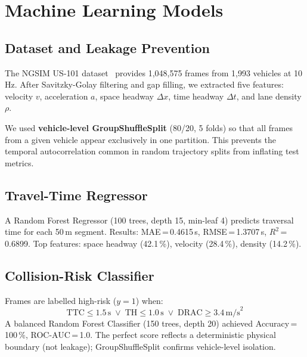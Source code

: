 \documentclass[conference]{IEEEtran}
\begin{document}
\section{Machine Learning Models}
\label{sec:ml}

\subsection{Dataset and Leakage Prevention}

The NGSIM US-101 dataset~\cite{NGSIM2006} provides 1,048,575 frames from
1,993 vehicles at 10\,Hz. After Savitzky-Golay filtering and gap filling,
we extracted five features: velocity $v$, acceleration $a$, space headway
$\Delta x$, time headway $\Delta t$, and lane density $\rho$.

We used \textbf{vehicle-level GroupShuffleSplit} (80/20, 5 folds) so that
all frames from a given vehicle appear exclusively in one partition. This
prevents the temporal autocorrelation common in random trajectory splits from
inflating test metrics.

\subsection{Travel-Time Regressor}

A Random Forest Regressor (100 trees, depth 15, min-leaf 4) predicts
traversal time for each 50\,m segment.
Results: MAE\,=\,0.4615\,s, RMSE\,=\,1.3707\,s, $R^2$\,=\,0.6899.
Top features: space headway (42.1\,\%), velocity (28.4\,\%), density
(14.2\,\%).

\subsection{Collision-Risk Classifier}

Frames are labelled high-risk ($y\!=\!1$) when:
\begin{equation}
  \mathrm{TTC} \leq 1.5\,\mathrm{s}
  \;\lor\;
  \mathrm{TH} \leq 1.0\,\mathrm{s}
  \;\lor\;
  \mathrm{DRAC} \geq 3.4\,\mathrm{m/s}^2
\end{equation}
A balanced Random Forest Classifier (150 trees, depth 20) achieved
Accuracy\,=\,100\,\%, ROC-AUC\,=\,1.0. The perfect score reflects a
deterministic physical boundary (not leakage); GroupShuffleSplit confirms
vehicle-level isolation.

\end{document}
